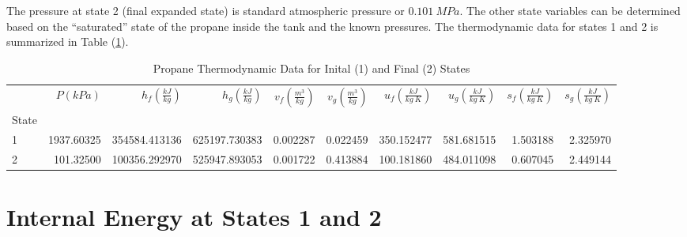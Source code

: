 \documentclass[10pt,parskip=half,
toc=sectionentrywithdots,
bibliography=totocnumbered,
captions=tableheading,numbers=noendperiod]{scrartcl}
\begin{document}
The pressure at state 2 (final expanded state) is standard atmospheric
pressure or \(0.101\:MPa\). The other state variables can be determined
based on the ``saturated'' state of the propane inside the tank and the
known pressures. The thermodynamic data for states 1 and 2 is summarized
in Table (\cref{tbl:thermo}).

\begin{table}[H]
\caption{Propane Thermodynamic Data for Inital (1) and Final (2) States}\label{tbl:thermo}
\centering
\begin{adjustbox}{max width=\textwidth}
\begin{tabular}{lrrrrrrrrr}
\toprule
{} &  $P \left(kPa\right)$ &  $h_f \left(\frac{kJ}{kg}\right)$ &  $h_g \left(\frac{kJ}{kg}\right)$ &  $v_f \left(\frac{m^3}{kg}\right)$ &  $v_g \left(\frac{m^3}{kg}\right)$ &  $u_f \left(\frac{kJ}{kg\:K}\right)$ &  $u_g \left(\frac{kJ}{kg\:K}\right)$ &  $s_f \left(\frac{kJ}{kg\:K}\right)$ &  $s_g \left(\frac{kJ}{kg\:K}\right)$ \\
State &                       &                                   &                                   &                                    &                                    &                                      &                                      &                                      &                                      \\
\midrule
1     &            1937.60325 &                     354584.413136 &                     625197.730383 &                           0.002287 &                           0.022459 &                           350.152477 &                           581.681515 &                             1.503188 &                             2.325970 \\
2     &             101.32500 &                     100356.292970 &                     525947.893053 &                           0.001722 &                           0.413884 &                           100.181860 &                           484.011098 &                             0.607045 &                             2.449144 \\
\bottomrule
\end{tabular}

\end{adjustbox}
\end{table}

\hypertarget{internal-energy-at-states-1-and-2}{%
\section{Internal Energy at States 1 and
2}\label{internal-energy-at-states-1-and-2}}
\end{document}
